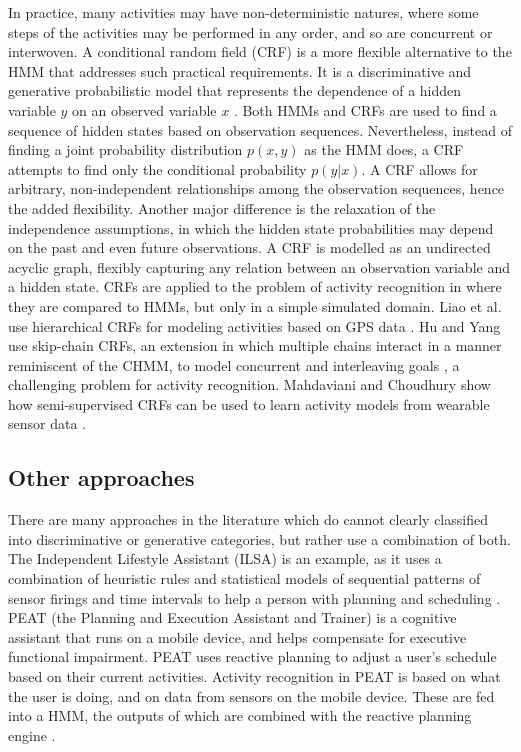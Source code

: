 In practice, many activities may have non-deterministic natures, where some steps of the activities may be performed in any order, and so are concurrent or interwoven. A conditional random field (CRF) is a more flexible alternative to the HMM that addresses such practical requirements. It is a discriminative and generative probabilistic model that represents the dependence of a hidden variable $y$ on an observed variable $x$ \cite{Sutton2007}. Both HMMs and CRFs are used to find a sequence of hidden states based on observation sequences. Nevertheless, instead of finding a joint probability distribution $p(x,y)$ as the HMM does, a CRF attempts to find only the conditional probability $p(y|x)$. A CRF allows for arbitrary, non-independent relationships among the observation sequences, hence the added flexibility. Another major difference is the relaxation of the independence assumptions, in which the hidden state probabilities may depend on the past and even future observations. A CRF is modelled as an undirected acyclic graph, flexibly capturing any relation between an observation variable and a hidden state. CRFs are applied to the problem of activity recognition in \cite{Vail2007} where they are compared to HMMs, but only in a simple simulated domain. Liao et al. use hierarchical CRFs for modeling activities based on GPS data \cite{Liao2007}. Hu and Yang use skip-chain CRFs, an extension in which multiple chains interact in a manner reminiscent of the CHMM, to model concurrent and interleaving goals \cite{Hu2008}, a challenging problem for activity recognition. Mahdaviani and Choudhury show how semi-supervised CRFs can be used to learn activity models from wearable sensor data \cite{Mahdaviani2008}.

\subsection{Other approaches}

There are many approaches in the literature which do cannot clearly classified into discriminative or generative categories, but rather use a combination of both. The Independent Lifestyle Assistant (ILSA) is an example, as it uses a combination of heuristic rules and statistical models of sequential patterns of sensor firings and time intervals to help a person with planning and scheduling \cite{Guralnik2002}. PEAT (the Planning and Execution Assistant and Trainer) is a cognitive assistant that runs on a mobile device, and helps compensate for executive functional impairment. PEAT uses reactive planning to adjust a user’s schedule based on their current activities. Activity recognition in PEAT is based on what the user is doing, and on data from sensors on the mobile device. These are fed into a HMM, the outputs of which are combined with the reactive planning engine \cite{Modayil2008}.

